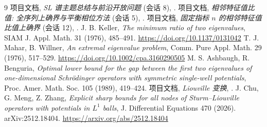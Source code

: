 \documentclass[UTF8]{ctexart}
\begin{document}
\begin{thebibliography}{9}
 项目文档, \emph{SL 谱主题总结与前沿开放问题} (会话 8),
	.
 项目文档, \emph{相邻特征值比值: 全序列上确界与平衡相位方法}
	(会话 5), .
 项目文档, \emph{固定指标 $n$ 的相邻特征值比值上确界}
	(会话 12), .
 J. B. Keller, \emph{The minimum ratio of two eigenvalues},
	SIAM J. Appl. Math. 31 (1976), 485--491.
	\url{https://doi.org/10.1137/0131042}
 T. J. Mahar, B. Willner, \emph{An extremal eigenvalue problem},
	Comm. Pure Appl. Math. 29 (1976), 517--529.
	\url{https://doi.org/10.1002/cpa.3160290505}
 M. S. Ashbaugh, R. Benguria, \emph{Optimal lower bound for
	the gap between the first two eigenvalues of one-dimensional
	Schr\"odinger operators with symmetric single-well potentials},
	Proc. Amer. Math. Soc. 105 (1989), 419--424.
 项目文档, \emph{Liouville 变换}, .
 J. Chu, G. Meng, Z. Zhang, \emph{Explicit sharp bounds for all
	nodes of Sturm--Liouville operators with potentials in $L^1$ balls},
	J. Differential Equations 470 (2026). arXiv:2512.18404.
	\url{https://arxiv.org/abs/2512.18404}
\end{thebibliography}
\end{document}
